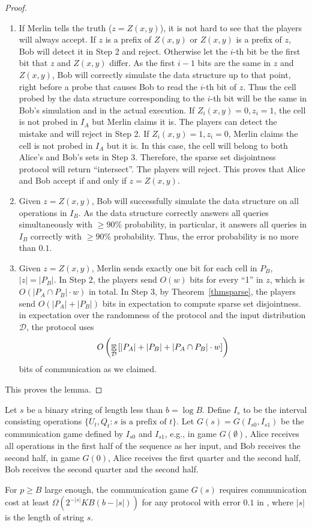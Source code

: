\documentclass[11pt]{article}
\begin{document}
\begin{proof}
{\begin{enumerate}
\item
	If Merlin tells the truth ($z=Z(x, y)$), it is not hard to see that the players will always accept. If $z$ is a prefix of $Z(x, y)$ or $Z(x, y)$ is a prefix of $z$, Bob will detect it in Step 2 and reject. Otherwise let the $i$-th bit be the first bit that $z$ and $Z(x, y)$ differ. As the first $i-1$ bits are the same in $z$ and $Z(x, y)$, Bob will correctly simulate the data structure up to that point, right before a probe that causes Bob to read the $i$-th bit of $z$. Thus the cell probed by the data structure corresponding to the $i$-th bit will be the same in Bob's simulation and in the actual execution.  If $Z_i(x, y)=0,z_i=1$, the cell is not probed in $I_A$ but Merlin claims it is. The players can detect the mistake and will reject in Step 2. If $Z_i(x, y)=1,z_i=0$, Merlin claims the cell is not probed in $I_A$ but it is. In this case, the cell will belong to both Alice's and Bob's sets in Step 3. Therefore, the sparse set disjointness protocol will return ``intersect''. The players will reject. This proves that Alice and Bob accept if and only if $z=Z(x, y)$. 
\item
	Given $z=Z(x, y)$, Bob will successfully simulate the data structure on all operations in $I_B$. As the data structure correctly answers all queries simultaneously with $\geq 90\%$ probability, in particular, it answers all queries in $I_B$ correctly with $\geq 90\%$ probability. Thus, the error probability is no more than $0.1$. 
\item
	Given $z=Z(x, y)$, Merlin sends exactly one bit for each cell in $P_B$, $|z|=|P_B|$. In Step 2, the players send $O(w)$ bits for every ``1'' in $z$, which is $O(|P_A\cap P_B|\cdot w)$ in total. In Step 3, by Theorem~\ref{thmsparse}, the players send $O(|P_A|+|P_B|)$ bits in expectation to compute sparse set disjointness. in expectation over the randomness of the protocol and the input distribution $\mathcal{D}$, the protocol uses 
	\[O\left(\mathop{\mathbb{E}}_{\mathcal{D}}\left[|P_A|+|P_B|+|P_A\cap P_B|\cdot w\right]\right)\] bits of communication as we claimed. 
\end{enumerate}

This proves the lemma.
}

\end{proof}

Let $s$ be a binary string of length less than $b=\log B$. Define $I_s$ to be the interval consisting operations $\{U_t, Q_t: \textrm{$s$ is a prefix of $t$}\}$. Let $G(s)=G(I_{s0},I_{s1})$ be the communication game defined by $I_{s0}$ and $I_{s1}$, e.g., in game $G(\emptyset)$, Alice receives all operations in the first half of the sequence as her input, and Bob receives the second half, in game $G(0)$, Alice receives the first quarter and the second half, Bob receives the second quarter and the second half. 
\begin{lemma}\label{commlower}
For $p\geq B$ large enough, the communication game $G(s)$ requires communication cost at least $\Omega(2^{-|s|}KB(b-|s|))$ for any protocol with error $0.1$ in \mm{}, where $|s|$ is the length of string $s$. 
\end{lemma}
\end{document}
